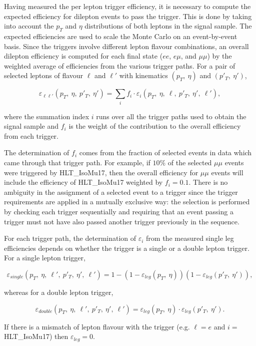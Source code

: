 Having measured the per lepton trigger efficiency,
it is necessary to compute the expected efficiency for dilepton events to pass the trigger.
This is done by taking into account the $p_{T}$ and $\eta$ distributions
of both leptons in the signal sample. The expected efficiencies are used to scale
the Monte Carlo on an event-by-event basis. Since the triggers involve different lepton flavour 
combinations, an overall dilepton efficiency is computed for each final state ($ee$, $e\mu$, and $\mu\mu$) 
by the weighted average of efficiencies from the various trigger paths. For a pair of selected leptons of flavour 
$\ell$ and $\ell'$ with kinematics $(p_T,\:\eta)$ and $(p'_T,\:\eta')$, 

\begin{equation}
\varepsilon_{\ell\ell'}(p_T,\:\eta,\:p'_T,\:\eta') = \sum_i f_i\cdot\varepsilon_i(p_T,\:\eta,\:\ell,\:p'_T,\:\eta',\:\ell'),
\end{equation}

where the summation index $i$ runs over all the trigger paths used to obtain the signal sample and $f_i$
is the weight of the contribution to the overall efficiency from each trigger.

The determination of $f_i$ comes from the fraction of selected events in data which came 
through that trigger path. For example, if $10\%$ of the selected $\mu\mu$ events were triggered 
by HLT\_IsoMu17, then the overall efficiency for $\mu\mu$ events will include the efficiency 
of HLT\_IsoMu17 weighted by $f_i=0.1$. There is no ambiguity in the assignment of a selected event to
a trigger since the trigger requirements are applied in a mutually exclusive way: the selection is
performed by checking each trigger sequentially and requiring that an event passing a trigger
must not have also passed another trigger previously in the sequence.

For each trigger path, the determination of $\varepsilon_i$ from the measured single leg efficiencies depends
on whether the trigger is a single or a double lepton trigger. For a single lepton trigger,

\begin{equation}
\varepsilon_{single}(p_T,\:\eta,\:\ell',\:p'_T,\:\eta',\:\ell') = 
1 - \left(1-\varepsilon_{leg}(p_T,\:\eta)\right)\left(1-\varepsilon_{leg}(p'_T,\:\eta')\right),
\end{equation}

whereas for a double lepton trigger,

\begin{equation}
\varepsilon_{double}(p_T,\:\eta,\:\ell',\:p'_T,\:\eta',\:\ell') = \varepsilon_{leg}(p_T,\:\eta)\cdot\varepsilon_{leg}(p'_T,\:\eta').
\end{equation}

If there is a mismatch of lepton flavour with the trigger (e.g. $\ell=e$ and $i=$HLT\_IsoMu17) then $\varepsilon_{leg}=0$.
